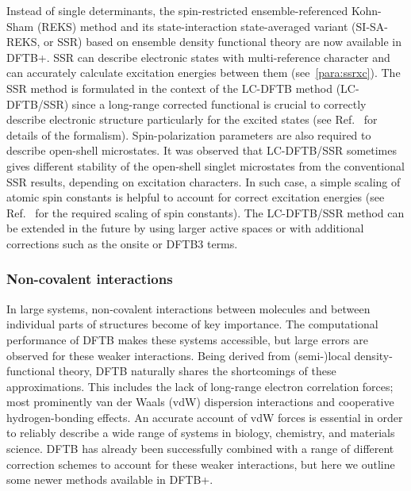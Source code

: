 \documentclass[reprint,onecolumn,superscriptaddress]{revtex4-1}
\newcommand{\dftbp}{DFTB+}
\begin{document}
Instead of single determinants, the spin-restricted ensemble-referenced
Kohn-Sham (REKS) method and its state-interaction state-averaged variant
(SI-SA-REKS, or SSR)\cite{Kazaryan2008, Filatov2015, Filatov2016, Filatov1999,
  Moreira2007, Filatov2017} based on ensemble density functional theory are now
available in \dftbp{}. SSR can describe electronic states with multi-reference
character and can accurately calculate excitation energies between them
(see~\ref{para:ssrxc}). The SSR method is formulated in the context of the
LC-DFTB method (LC-DFTB/SSR)\cite{Lee19} since a long-range corrected functional
is crucial to correctly describe electronic structure particularly for the
excited states (see Ref.~\cite{Lee19} for details of the formalism).
Spin-polarization parameters are also required to describe open-shell
microstates.  It was observed that LC-DFTB/SSR sometimes gives different
stability of the open-shell singlet microstates from the conventional SSR
results, depending on excitation characters. In such case, a simple scaling of
atomic spin constants is helpful to account for correct excitation energies (see
Ref.~\cite{Lee19} for the required scaling of spin constants).  The
LC-DFTB/SSR method can be extended in the future by using larger active spaces
or with additional corrections such as the onsite or DFTB3 terms.

\subsubsection{Non-covalent interactions}

In large systems, non-covalent interactions between molecules and between
individual parts of structures become of key importance. The computational
performance of DFTB makes these systems accessible, but large errors are observed
for these weaker interactions. Being derived from (semi-)local
density-functional theory, DFTB naturally shares the shortcomings of these
approximations. This includes the lack of long-range electron correlation
forces; most prominently van der Waals (vdW) dispersion interactions and
cooperative hydrogen-bonding effects. An accurate account of vdW forces is
essential in order to reliably describe a wide range of systems in biology,
chemistry, and materials science.  DFTB has already been successfully combined
with a range of different correction schemes\cite{elstner2001, brandenburg2014,
  mortazavi2018, Rapacioli2009, Petraglia2015, Stoehr2016} to account for these
weaker interactions, but here we outline some newer methods available in
\dftbp{}.
\end{document}

